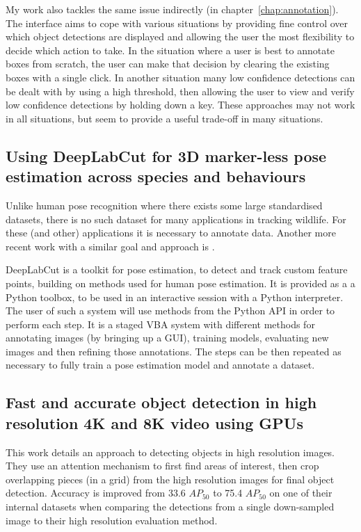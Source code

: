 My work also tackles the same issue indirectly (in chapter~\ref{chap:annotation}). The interface aims to cope with various situations by providing fine control over which object detections are displayed and allowing the user the most flexibility to decide which action to take. In the situation where a user is best to annotate boxes from scratch, the user can make that decision by clearing the existing boxes with a single click. In another situation many low confidence detections can be dealt with by using a high threshold, then allowing the user to view and verify low confidence detections by holding down a key. These approaches may not work in all situations, but seem to provide a useful trade-off in many situations.

\subsection {Using DeepLabCut for 3D marker-less pose estimation across species and behaviours \cite{Nath2018, Mathis2018}}

Unlike human pose recognition where there exists some large standardised datasets, there is no such dataset for many applications in tracking wildlife. For these (and other) applications it is necessary to annotate data. Another more recent work with a similar goal and approach is \cite{Graving2019}.

DeepLabCut is a toolkit for pose estimation, to detect and track custom feature points, building on methods used for human pose estimation. It is provided as a a Python toolbox, to be used in an interactive session with a Python interpreter. The user of such a system will use methods from the Python \gls{API} in order to perform each step. It is a staged \gls{VBA} system with different methods for annotating images (by bringing up a GUI), training models, evaluating new images and then refining those annotations. The steps can be then repeated as necessary to fully train a pose estimation model and annotate a dataset. 

\subsection{Fast and accurate object detection in high resolution 4K and 8K video using GPUs \cite{Ruzicka2018}}

This work details an approach to detecting objects in high resolution images. They use an attention mechanism to first find areas of interest, then crop overlapping pieces (in a grid) from the high resolution images for final object detection. Accuracy is improved from 33.6 $AP_{50}$ to 75.4 $AP_{50}$ on one of their internal datasets when comparing the detections from a single down-sampled image to their high resolution evaluation method. 

